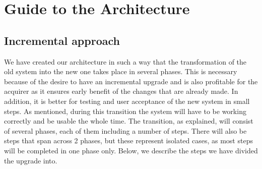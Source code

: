 \chapter{Guide to the Architecture}

\section{Incremental approach}
We have created our architecture in such a way that the transformation
of the old system into the new one takes place in several phases. This is
necessary because of the desire to have an incremental upgrade and is
also profitable for the acquirer as it ensures early benefit of the changes
that are already made. In addition, it is better for testing and user
acceptance of the new system in small steps. As mentioned, during this
transition the system will have to be working correctly and be usable
the whole time. The transition, as explained, will consist of several
phases, each of them including a number of steps. There will also be
steps that span across 2 phases, but these represent isolated
cases, as most steps will be completed in one phase only. Below, we
describe the steps we have divided the upgrade into.

